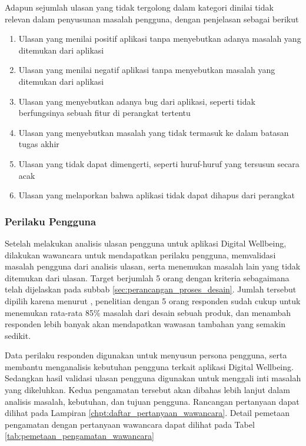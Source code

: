 Adapun sejumlah ulasan yang tidak tergolong dalam kategori dinilai tidak relevan dalam penyusunan masalah pengguna, dengan penjelasan sebagai berikut

\begin{enumerate}
  \item Ulasan yang menilai positif aplikasi tanpa menyebutkan adanya masalah yang ditemukan dari aplikasi
  \item Ulasan yang menilai negatif aplikasi tanpa menyebutkan masalah yang ditemukan dari aplikasi
  \item Ulasan yang menyebutkan adanya bug dari aplikasi, seperti tidak berfungsinya sebuah fitur di perangkat tertentu
  \item Ulasan yang menyebutkan masalah yang tidak termasuk ke dalam batasan tugas akhir
  \item Ulasan yang tidak dapat dimengerti, seperti huruf-huruf yang tersusun secara acak 
  \item Ulasan yang melaporkan bahwa aplikasi tidak dapat dihapus dari perangkat
\end{enumerate}

\subsubsection{Perilaku Pengguna}
Setelah melakukan analisis ulasan pengguna untuk aplikasi Digital Wellbeing, dilakukan wawancara untuk mendapatkan perilaku pengguna, memvalidasi masalah pengguna dari analisis ulasan, serta menemukan masalah lain yang tidak ditemukan dari ulasan. Target berjumlah 5 orang dengan kriteria sebagaimana telah dijelaskan pada subbab \ref{sec:perancangan_proses_desain}. Jumlah tersebut dipilih karena menurut \textcite{nielsenusabilityproblems}, penelitian dengan 5 orang responden sudah cukup untuk menemukan rata-rata 85\% masalah dari desain sebuah produk, dan menambah responden lebih banyak akan mendapatkan wawasan tambahan yang semakin sedikit.

 Data perilaku responden digunakan untuk menyusun persona pengguna, serta membantu menganalisis kebutuhan pengguna terkait aplikasi Digital Wellbeing. Sedangkan hasil validasi ulasan pengguna digunakan untuk  menggali inti masalah yang dikeluhkan. Kedua pengamatan tersebut akan dibahas lebih lanjut dalam analisis masalah, kebutuhan, dan tujuan pengguna. Rancangan pertanyaan dapat dilihat pada Lampiran \ref{chpt:daftar_pertanyaan_wawancara}. Detail pemetaan pengamatan dengan pertanyaan wawancara dapat dilihat pada Tabel \ref{tab:pemetaan_pengamatan_wawancara}

